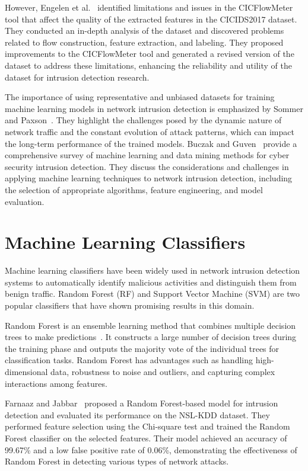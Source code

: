 However, Engelen et al.~\cite{engelen2021troubleshooting} identified limitations and issues in the CICFlowMeter tool that affect the quality of the extracted features in the CICIDS2017 dataset. They conducted an in-depth analysis of the dataset and discovered problems related to flow construction, feature extraction, and labeling. They proposed improvements to the CICFlowMeter tool and generated a revised version of the dataset to address these limitations, enhancing the reliability and utility of the dataset for intrusion detection research.

The importance of using representative and unbiased datasets for training machine learning models in network intrusion detection is emphasized by Sommer and Paxson~\cite{sommer2010outside}. They highlight the challenges posed by the dynamic nature of network traffic and the constant evolution of attack patterns, which can impact the long-term performance of the trained models. Buczak and Guven~\cite{buczak2015survey} provide a comprehensive survey of machine learning and data mining methods for cyber security intrusion detection. They discuss the considerations and challenges in applying machine learning techniques to network intrusion detection, including the selection of appropriate algorithms, feature engineering, and model evaluation.

\section{Machine Learning Classifiers}

Machine learning classifiers have been widely used in network intrusion detection systems to automatically identify malicious activities and distinguish them from benign traffic. Random Forest (RF) and Support Vector Machine (SVM) are two popular classifiers that have shown promising results in this domain.

Random Forest is an ensemble learning method that combines multiple decision trees to make predictions~\cite{hastie2009random}. It constructs a large number of decision trees during the training phase and outputs the majority vote of the individual trees for classification tasks. Random Forest has advantages such as handling high-dimensional data, robustness to noise and outliers, and capturing complex interactions among features.

Farnaaz and Jabbar~\cite{farnaaz2016random} proposed a Random Forest-based model for intrusion detection and evaluated its performance on the NSL-KDD dataset. They performed feature selection using the Chi-square test and trained the Random Forest classifier on the selected features. Their model achieved an accuracy of 99.67\% and a low false positive rate of 0.06\%, demonstrating the effectiveness of Random Forest in detecting various types of network attacks.

